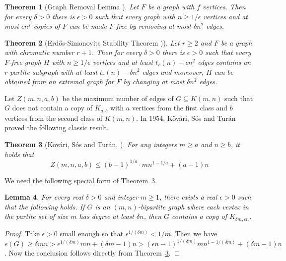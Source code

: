 \documentclass[10pt]{article}
\newtheorem{theorem}{Theorem}[section]
\newtheorem{lemma}[theorem]{Lemma}
\begin{document}
\begin{theorem}[Graph Removal Lemma \cite{Komlos1996}]\label{removal lemma} Let $F$ be a graph with $f$ vertices. Then for every $\delta>0$ there is $\epsilon>0$ such that every graph with $n\geq 1/\epsilon$ vertices and at most $\epsilon n^f$ copies of $F$ can be made $F$-free by removing at most $\delta n^2$ edges.
\end{theorem}

\begin{theorem}[Erd\H{o}s-Simonovits Stability Theorem \cite{erdHos1967,erdHos1968,Simonovits1968})]\label{stability theorem}
Let $r\geq2$ and $F$ be a graph with chromatic number $r+1$.
Then for every $\delta>0$ there is $\epsilon >0$ such that every $F$-free graph $H$ with $n\geq1/\epsilon$ vertices and at least $t_r(n)-\epsilon n^2$ edges contains an $r$-partite subgraph with at least $t_r(n)-\delta n^2$ edges and
moreover, $H$ can be obtained from an extremal graph for $F$ by changing at most $\delta n^2$ edges.
\end{theorem}


Let $Z(m,n,a,b)$ be the maximum number of edges of $G\subseteq K(m,n)$ such that $G$ does not contain a copy of $K_{a,b}$ with $a$ vertices from the first class and $b$ vertices from the second class of $K(m,n)$. In 1954, K\"{o}v\'{a}ri, S\'{o}s and Tur\'{a}n \cite{Kovari1954} proved the following classic result.

\begin{theorem}[K\"{o}v\'{a}ri, S\'{o}s and Tur\'{a}n, \cite{Kovari1954}]\label{Kab in bipartite graph}
For any integers $m\geq a$ and $n\geq b$, it holds that
$$Z(m,n,a,b)\leq (b-1)^{1/a}\cdot m n ^{1-1/a} + (a-1)n$$
\end{theorem}


We need the following special form of Theorem~\ref{Kab in bipartite graph}.

\begin{lemma}\label{bipartite graph with large degree contain bipartite complete graph}
For every real $\delta>0$ and integer $m\geq 1$, there exists a real $\epsilon>0$ such that the following holds.
If $G$ is an $(m,n)$-bipartite graph where each vertex in the partite set of size $m$ has degree at least $\delta n$,
then $G$ contains a copy of $K_{\delta m,\epsilon n}$.
\end{lemma}
\begin{proof}
Take $\epsilon>0$ small enough so that $\epsilon^{1/(\delta m)}<1/m$.
Then we have $e(G)\geq \delta mn> \epsilon^{1/(\delta m)} m  n +(\delta m-1)n> (\epsilon n-1)^{1/(\delta m)}   m n ^{1-1/(\delta m)} + (\delta m-1)n$.
Now the conclusion follows directly from Theorem~\ref{Kab in bipartite graph}.
\end{proof}
\end{document}
